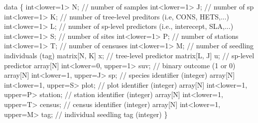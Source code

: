 \documentclass[
  12pt,
  letterpaper,
  DIV=11,
  numbers=noendperiod]{scrartcl}
\newenvironment{Shaded}{\begin{snugshade}}{\end{snugshade}}
\newcommand{\CommentTok}[1]{\textcolor[rgb]{0.37,0.37,0.37}{#1}}
\newcommand{\DataTypeTok}[1]{\textcolor[rgb]{0.68,0.00,0.00}{#1}}
\newcommand{\DecValTok}[1]{\textcolor[rgb]{0.68,0.00,0.00}{#1}}
\newcommand{\KeywordTok}[1]{\textcolor[rgb]{0.00,0.23,0.31}{#1}}
\newcommand{\NormalTok}[1]{\textcolor[rgb]{0.00,0.23,0.31}{#1}}
\begin{document}
\begin{Shaded}
\begin{Highlighting}[]
\KeywordTok{data}\NormalTok{ \{}
  \DataTypeTok{int}\NormalTok{\textless{}}\KeywordTok{lower}\NormalTok{=}\DecValTok{1}\NormalTok{\textgreater{} N; }\CommentTok{// number of samples}
  \DataTypeTok{int}\NormalTok{\textless{}}\KeywordTok{lower}\NormalTok{=}\DecValTok{1}\NormalTok{\textgreater{} J; }\CommentTok{// number of sp}
  \DataTypeTok{int}\NormalTok{\textless{}}\KeywordTok{lower}\NormalTok{=}\DecValTok{1}\NormalTok{\textgreater{} K; }\CommentTok{// number of tree{-}level preditors (i.e, CONS, HETS,...)}
  \DataTypeTok{int}\NormalTok{\textless{}}\KeywordTok{lower}\NormalTok{=}\DecValTok{1}\NormalTok{\textgreater{} L; }\CommentTok{// number of sp{-}level predictors (i.e., interecept, SLA,...)}
  \DataTypeTok{int}\NormalTok{\textless{}}\KeywordTok{lower}\NormalTok{=}\DecValTok{1}\NormalTok{\textgreater{} S; }\CommentTok{// number of sites}
  \DataTypeTok{int}\NormalTok{\textless{}}\KeywordTok{lower}\NormalTok{=}\DecValTok{1}\NormalTok{\textgreater{} P; }\CommentTok{// number of stations}
  \DataTypeTok{int}\NormalTok{\textless{}}\KeywordTok{lower}\NormalTok{=}\DecValTok{1}\NormalTok{\textgreater{} T; }\CommentTok{// number of censuses}
  \DataTypeTok{int}\NormalTok{\textless{}}\KeywordTok{lower}\NormalTok{=}\DecValTok{1}\NormalTok{\textgreater{} M; }\CommentTok{// number of seedling individuals (tag)}
  \DataTypeTok{matrix}\NormalTok{[N, K] x; }\CommentTok{// tree{-}level predictor}
  \DataTypeTok{matrix}\NormalTok{[L, J] u; }\CommentTok{// sp{-}level predictor}
  \DataTypeTok{array}\NormalTok{[N] }\DataTypeTok{int}\NormalTok{\textless{}}\KeywordTok{lower}\NormalTok{=}\DecValTok{0}\NormalTok{, }\KeywordTok{upper}\NormalTok{=}\DecValTok{1}\NormalTok{\textgreater{} suv; }\CommentTok{// binary outcome (1 or 0)}
  \DataTypeTok{array}\NormalTok{[N] }\DataTypeTok{int}\NormalTok{\textless{}}\KeywordTok{lower}\NormalTok{=}\DecValTok{1}\NormalTok{, }\KeywordTok{upper}\NormalTok{=J\textgreater{} sp; }\CommentTok{// species identifier (integer)}
  \DataTypeTok{array}\NormalTok{[N] }\DataTypeTok{int}\NormalTok{\textless{}}\KeywordTok{lower}\NormalTok{=}\DecValTok{1}\NormalTok{, }\KeywordTok{upper}\NormalTok{=S\textgreater{} plot; }\CommentTok{// plot identifier (integer)}
  \DataTypeTok{array}\NormalTok{[N] }\DataTypeTok{int}\NormalTok{\textless{}}\KeywordTok{lower}\NormalTok{=}\DecValTok{1}\NormalTok{, }\KeywordTok{upper}\NormalTok{=P\textgreater{} station; }\CommentTok{// station identifier (integer)}
  \DataTypeTok{array}\NormalTok{[N] }\DataTypeTok{int}\NormalTok{\textless{}}\KeywordTok{lower}\NormalTok{=}\DecValTok{1}\NormalTok{, }\KeywordTok{upper}\NormalTok{=T\textgreater{} census; }\CommentTok{// census identifier (integer)}
  \DataTypeTok{array}\NormalTok{[N] }\DataTypeTok{int}\NormalTok{\textless{}}\KeywordTok{lower}\NormalTok{=}\DecValTok{1}\NormalTok{, }\KeywordTok{upper}\NormalTok{=M\textgreater{} tag; }\CommentTok{// individual seedling tag (integer)}
\NormalTok{\}}


\end{Highlighting}
\end{Shaded}
\end{document}
